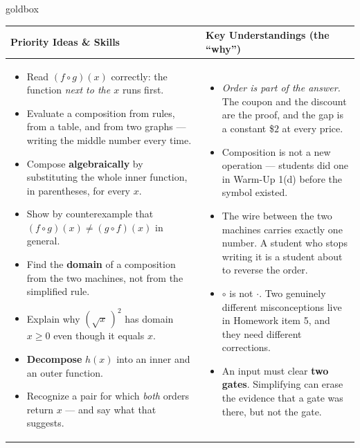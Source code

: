 \documentclass[10pt]{article}
\begin{document}
\renewcommand{\arraystretch}{1.4}
\begin{skillbox}{goldbox}
\begin{tabularx}{\linewidth}{@{}X|X@{}}
\textbf{Priority Ideas \& Skills} & \textbf{Key Understandings (the ``why'')} \\[2pt]
\hline
\vspace{-6pt}
\begin{itemize}[leftmargin=1.1em, nosep, after=\vspace{2pt}]
  \item Read $(f\circ g)(x)$ correctly: the function \emph{next to the $x$} runs first.
  \item Evaluate a composition from rules, from a table, and from two graphs --- writing the middle number every time.
  \item Compose \textbf{algebraically} by substituting the whole inner function, in parentheses, for every $x$.
  \item Show by counterexample that $(f\circ g)(x)\ne(g\circ f)(x)$ in general.
  \item Find the \textbf{domain} of a composition from the two machines, not from the simplified rule.
  \item Explain why $\left(\sqrt{x}\,\right)^{2}$ has domain $x\ge0$ even though it equals $x$.
  \item \textbf{Decompose} $h(x)$ into an inner and an outer function.
  \item Recognize a pair for which \emph{both} orders return $x$ --- and say what that suggests.
\end{itemize}
&
\vspace{-6pt}
\begin{itemize}[leftmargin=1.1em, nosep, after=\vspace{2pt}]
  \item \emph{Order is part of the answer.} The coupon and the discount are the proof, and the gap is a constant \$$2$ at every price.
  \item Composition is not a new operation --- students did one in Warm-Up 1(d) before the symbol existed.
  \item The wire between the two machines carries exactly one number. A student who stops writing it is a student about to reverse the order.
  \item $\circ$ is not $\cdot$. Two genuinely different misconceptions live in Homework item 5, and they need different corrections.
  \item An input must clear \textbf{two gates}. Simplifying can erase the evidence that a gate was there, but not the gate.

\end{itemize}
\end{tabularx}
\end{skillbox}
\end{document}

